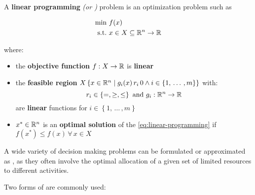 \documentclass[english]{article}
\begin{document}
\bigskip
\begin{definition}
  A \textbf{linear programming} \textit{(or \LP)} problem is an optimization problem such as

  \begin{gather*}
    \begin{aligned}
      \min \         & f(x)                                  \\
      \text{s.t.} \  & x \in X \subseteq \mathbb{R}^n \rightarrow \mathbb{R}
    \end{aligned}
    \label{eq:linear-programming}
  \end{gather*}

  where:

  \begin{itemize}
    \item the \textbf{objective function} \(f: X \rightarrow \mathbb{R}\) is \textbf{linear}
    \item the \textbf{feasible region} \(X \left\{ x \in \mathbb{R}^n \mid   g_i(x) \, r_i \, 0 \land i \in \left\{ 1, \, \ldots \,, m \right\}\right\}\) with: \[r_i \in \left\{ =, \geq, \leq \right\} \ \text{and} \ g_i: \R^n \rightarrow \R\] are \textbf{linear} functions for \(i \in \left\{ 1, \, \ldots \,, m \right\}\)

    \item \(x^\ast \in \mathbb{R}^n\) is an \textbf{optimal solution} of the \LP \ref{eq:linear-programming} if \(f(x^\ast) \leq f(x) \, \forall \, x \in X\)
  \end{itemize}
\end{definition}

\bigskip
A wide variety of decision making problems can be formulated or approximated as \LP, as they often involve the optimal allocation of a given set of limited resources to different activities.

\bigskip
Two forms of \LP are commonly used:
\end{document}
